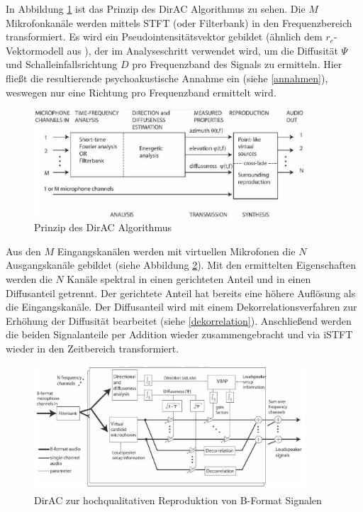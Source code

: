 In Abbildung \ref{fig:dirac_flow_general} ist das Prinzip des DirAC Algorithmus zu sehen. Die $M$ Mikrofonkanäle werden mittels STFT (oder Filterbank) in den Frequenzbereich transformiert. Es wird ein Pseudointensitätsvektor gebildet (ähnlich dem $r_e$-Vektormodell aus \cite{ambi-book}), der im Analyseschritt verwendet wird, um die Diffusität $\Psi$ und Schalleinfallsrichtung $D$ pro Frequenzband des Signals zu ermitteln. Hier fließt die resultierende psychoakustische Annahme ein (siehe \ref{annahmen}), weswegen nur eine Richtung pro Frequenzband ermittelt wird.

\begin{figure}[!ht]
  \centering
  \includegraphics[width=0.9\textwidth]{funktionsweise/pic/pulkki_dirac_flow.png}
  \caption{Prinzip des DirAC Algorithmus \cite{pulkki}}
  \label{fig:dirac_flow_general}
\end{figure}


Aus den $M$ Eingangskanälen werden mit virtuellen Mikrofonen die $N$ Ausgangskanäle gebildet (siehe Abbildung \ref{fig:dirac_flow_high}). Mit den ermittelten Eigenschaften werden die $N$ Kanäle spektral in einen gerichteten Anteil und in einen Diffusanteil getrennt. Der gerichtete Anteil hat bereits eine höhere Auflösung als die Eingangskanäle. Der Diffusanteil wird mit einem Dekorrelationsverfahren zur Erhöhung der Diffusität bearbeitet (siehe \ref{dekorrelation}). Anschließend werden die beiden Signalanteile per Addition wieder zusammengebracht und via iSTFT wieder in den Zeitbereich transformiert.

\begin{figure}[!ht]
  \centering
  \includegraphics[width=0.9\textwidth]{funktionsweise/pic/pulkki_dirac_flow_2.png}
  \caption{DirAC zur hochqualitativen Reproduktion von B-Format Signalen \cite{pulkki}}
  \label{fig:dirac_flow_high}
\end{figure}

